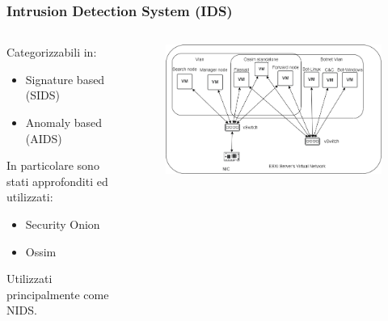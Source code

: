 \begin{frame}
    \frametitle{Intrusion Detection System (IDS)}
    \begin{columns}
        \begin{column}{0.5\textwidth}
            Categorizzabili in:
            \begin{itemize}
                \item Signature based (SIDS)
                \item Anomaly based (AIDS)
            \end{itemize}
            In particolare sono stati approfonditi ed utilizzati:
            \begin{itemize}
                \item Security Onion
                \item Ossim
            \end{itemize}
            Utilizzati principalmente come NIDS.
        \end{column}
        \begin{column}{0.5\textwidth}
            \begin{figure}
                \centering
                \includegraphics[width=\textwidth]{res/fig/infrastruttura2.png}
            \end{figure}
        \end{column}
    \end{columns}
\end{frame}